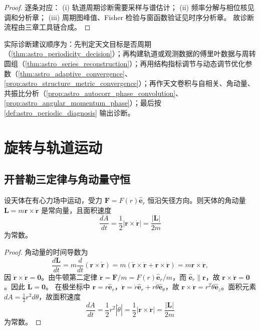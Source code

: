 \begin{proof}
逐条对应：
(i) 轨道周期诊断需要采样与谱估计；
(ii) 频率分解与相位核见调和分析章；
(iii) 周期图峰值、Fisher 检验与窗函数验证见时序分析章。
故诊断流程由三章工具链合成。
\end{proof}

\begin{remark}[整合后的操作顺序]\label{rem:astro_integration_order}
实际诊断建议顺序为：先判定天文目标是否周期（\cref{thm:astro_periodicity_decision}）；再构建轨道或观测数据的傅里叶数据与周转圆组（\cref{thm:astro_series_reconstruction}）；再用结构指标调节与动态调节优化参数（\cref{thm:astro_adaptive_convergence}、\cref{prop:astro_structure_metric_convergence}）；再作天文卷积与自相关、角动量、共振比分析（\cref{prop:astro_autocorr_phase_convolution}、\cref{prop:astro_angular_momentum_phase}）；最后按 \cref{def:astro_periodic_diagnosis} 输出诊断。
\end{remark}

\section{旋转与轨道运动}
\label{sec:astro_rotation}

\subsection{开普勒三定律与角动量守恒}

\begin{lemma}[有心力场面积速度守恒]\label{ch17_lemma_areal_velocity}
设天体在有心力场中运动，受力 \(\mathbf F=F(r)\hat{\mathbf e}_r\) 恒沿矢径方向。则天体的角动量 \(\mathbf L=m\mathbf r\times\dot{\mathbf r}\) 是常向量，且面积速度
\[
\frac{dA}{dt}=\frac12|\mathbf r\times\dot{\mathbf r}|=\frac{|\mathbf L|}{2m}
\]
为常数。
\end{lemma}

\begin{proof}
角动量的时间导数为
\[
\frac{d\mathbf L}{dt}=m\frac{d}{dt}(\mathbf r\times\dot{\mathbf r})=m(\dot{\mathbf r}\times\dot{\mathbf r}+\mathbf r\times\ddot{\mathbf r})=m\mathbf r\times\ddot{\mathbf r},
\]
因 \(\dot{\mathbf r}\times\dot{\mathbf r}=\mathbf 0\)。由牛顿第二定律 \(\ddot{\mathbf r}=\mathbf F/m=F(r)\hat{\mathbf e}_r/m\)，而 \(\hat{\mathbf e}_r\parallel\mathbf r\)，故 \(\mathbf r\times\ddot{\mathbf r}=\mathbf 0\)。因此 \(\dot{\mathbf L}=\mathbf 0\)。
在极坐标中 \(\mathbf r=r\hat{\mathbf e}_r\)，\(\dot{\mathbf r}=\dot r\hat{\mathbf e}_r+r\dot\theta\hat{\mathbf e}_\theta\)，故 \(\mathbf r\times\dot{\mathbf r}=r^2\dot\theta\hat{\mathbf e}_z\)。面积元素 \(dA=\frac12r^2d\theta\)，故面积速度
\[
\frac{dA}{dt}=\frac12r^2|\dot\theta|=\frac12|\mathbf r\times\dot{\mathbf r}|=\frac{|\mathbf L|}{2m}
\]
为常数。
\end{proof}

